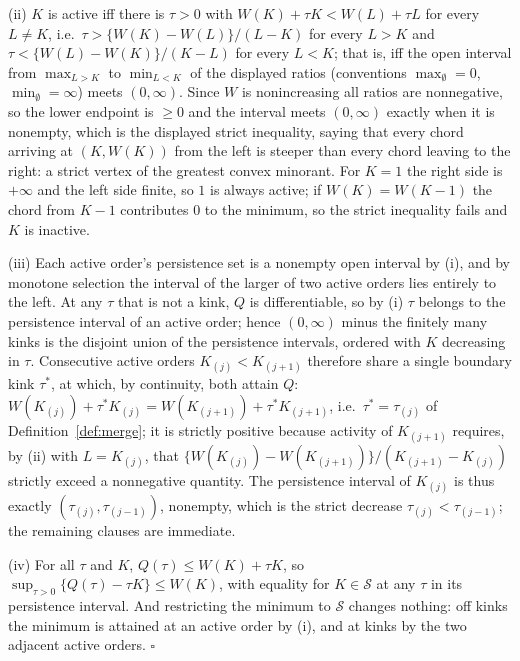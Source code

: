 \documentclass[11pt]{article}
\newcommand{\calS}{\mathcal S}
\begin{document}
(ii) $K$ is active iff there is $\tau>0$ with $W(K)+\tau K<W(L)+\tau L$ for every $L\ne K$, i.e.\ $\tau>\{W(K)-W(L)\}/(L-K)$ for every $L>K$ and $\tau<\{W(L)-W(K)\}/(K-L)$ for every $L<K$; that is, iff the open interval from $\max_{L>K}$ to $\min_{L<K}$ of the displayed ratios (conventions $\max_\emptyset=0$, $\min_\emptyset=\infty$) meets $(0,\infty)$. Since $W$ is nonincreasing all ratios are nonnegative, so the lower endpoint is $\ge0$ and the interval meets $(0,\infty)$ exactly when it is nonempty, which is the displayed strict inequality, saying that every chord arriving at $(K,W(K))$ from the left is steeper than every chord leaving to the right: a strict vertex of the greatest convex minorant. For $K=1$ the right side is $+\infty$ and the left side finite, so $1$ is always active; if $W(K)=W(K-1)$ the chord from $K-1$ contributes $0$ to the minimum, so the strict inequality fails and $K$ is inactive.

(iii) Each active order's persistence set is a nonempty open interval by (i), and by monotone selection the interval of the larger of two active orders lies entirely to the left. At any $\tau$ that is not a kink, $Q$ is differentiable, so by (i) $\tau$ belongs to the persistence interval of an active order; hence $(0,\infty)$ minus the finitely many kinks is the disjoint union of the persistence intervals, ordered with $K$ decreasing in $\tau$. Consecutive active orders $K_{(j)}<K_{(j+1)}$ therefore share a single boundary kink $\tau^\ast$, at which, by continuity, both attain $Q$: $W(K_{(j)})+\tau^\ast K_{(j)}=W(K_{(j+1)})+\tau^\ast K_{(j+1)}$, i.e.\ $\tau^\ast=\tau_{(j)}$ of Definition~\ref{def:merge}; it is strictly positive because activity of $K_{(j+1)}$ requires, by (ii) with $L=K_{(j)}$, that $\{W(K_{(j)})-W(K_{(j+1)})\}/(K_{(j+1)}-K_{(j)})$ strictly exceed a nonnegative quantity. The persistence interval of $K_{(j)}$ is thus exactly $(\tau_{(j)},\tau_{(j-1)})$, nonempty, which is the strict decrease $\tau_{(j)}<\tau_{(j-1)}$; the remaining clauses are immediate.

(iv) For all $\tau$ and $K$, $Q(\tau)\le W(K)+\tau K$, so $\sup_{\tau>0}\{Q(\tau)-\tau K\}\le W(K)$, with equality for $K\in\calS$ at any $\tau$ in its persistence interval. And restricting the minimum to $\calS$ changes nothing: off kinks the minimum is attained at an active order by (i), and at kinks by the two adjacent active orders. \hfill$\square$
\end{document}

